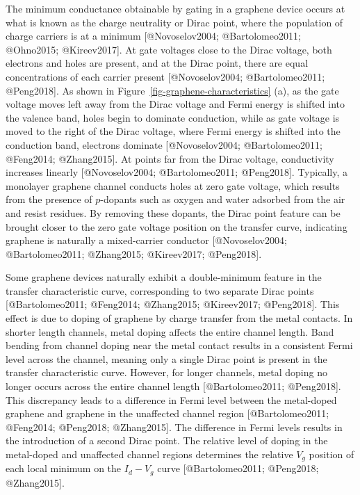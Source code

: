 \documentclass[
  letterpaper,
  DIV=11,
  numbers=noendperiod]{scrartcl}
\begin{document}
The minimum conductance obtainable by gating in a graphene device occurs
at what is known as the charge neutrality or Dirac point, where the
population of charge carriers is at a minimum {[}@Novoselov2004;
@Bartolomeo2011; @Ohno2015; @Kireev2017{]}. At gate voltages close to
the Dirac voltage, both electrons and holes are present, and at the
Dirac point, there are equal concentrations of each carrier present
{[}@Novoselov2004; @Bartolomeo2011; @Peng2018{]}. As shown in
Figure~\ref{fig-graphene-characteristics} (a), as the gate voltage moves
left away from the Dirac voltage and Fermi energy is shifted into the
valence band, holes begin to dominate conduction, while as gate voltage
is moved to the right of the Dirac voltage, where Fermi energy is
shifted into the conduction band, electrons dominate {[}@Novoselov2004;
@Bartolomeo2011; @Feng2014; @Zhang2015{]}. At points far from the Dirac
voltage, conductivity increases linearly {[}@Novoselov2004;
@Bartolomeo2011; @Peng2018{]}. Typically, a monolayer graphene channel
conducts holes at zero gate voltage, which results from the presence of
\(p\)-dopants such as oxygen and water adsorbed from the air and resist
residues. By removing these dopants, the Dirac point feature can be
brought closer to the zero gate voltage position on the transfer curve,
indicating graphene is naturally a mixed-carrier conductor
{[}@Novoselov2004; @Bartolomeo2011; @Zhang2015; @Kireev2017;
@Peng2018{]}.

Some graphene devices naturally exhibit a double-minimum feature in the
transfer characteristic curve, corresponding to two separate Dirac
points {[}@Bartolomeo2011; @Feng2014; @Zhang2015; @Kireev2017;
@Peng2018{]}. This effect is due to doping of graphene by charge
transfer from the metal contacts. In shorter length channels, metal
doping affects the entire channel length. Band bending from channel
doping near the metal contact results in a consistent Fermi level across
the channel, meaning only a single Dirac point is present in the
transfer characteristic curve. However, for longer channels, metal
doping no longer occurs across the entire channel length
{[}@Bartolomeo2011; @Peng2018{]}. This discrepancy leads to a difference
in Fermi level between the metal-doped graphene and graphene in the
unaffected channel region {[}@Bartolomeo2011; @Feng2014; @Peng2018;
@Zhang2015{]}. The difference in Fermi levels results in the
introduction of a second Dirac point. The relative level of doping in
the metal-doped and unaffected channel regions determines the relative
\(V_g\) position of each local minimum on the \(I_d - V_g\) curve
{[}@Bartolomeo2011; @Peng2018; @Zhang2015{]}.
\end{document}
